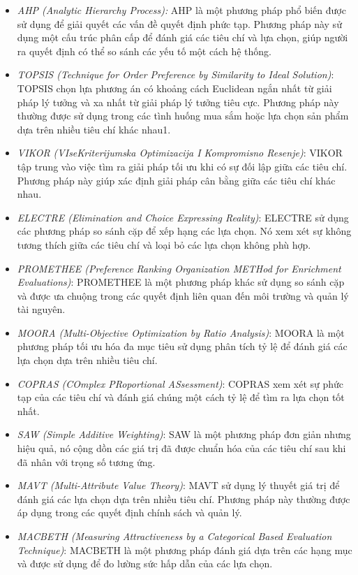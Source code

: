 \begin{itemize}
    \item \textit{AHP (Analytic Hierarchy Process):} AHP là một phương pháp phổ biến được sử dụng để giải quyết các vấn đề quyết định phức tạp. Phương pháp này sử dụng một cấu trúc phân cấp để đánh giá các tiêu chí và lựa chọn, giúp người ra quyết định có thể so sánh các yếu tố một cách hệ thống.
    \item \textit{TOPSIS (Technique for Order Preference by Similarity to Ideal Solution)}: TOPSIS chọn lựa phương án có khoảng cách Euclidean ngắn nhất từ giải pháp lý tưởng và xa nhất từ giải pháp lý tưởng tiêu cực. Phương pháp này thường được sử dụng trong các tình huống mua sắm hoặc lựa chọn sản phẩm dựa trên nhiều tiêu chí khác nhau1.
    \item \textit{VIKOR (VIseKriterijumska Optimizacija I Kompromisno Resenje)}: VIKOR tập trung vào việc tìm ra giải pháp tối ưu khi có sự đối lập giữa các tiêu chí. Phương pháp này giúp xác định giải pháp cân bằng giữa các tiêu chí khác nhau.
    \item \textit{ELECTRE (Elimination and Choice Expressing Reality)}: ELECTRE sử dụng các phương pháp so sánh cặp để xếp hạng các lựa chọn. Nó xem xét sự không tương thích giữa các tiêu chí và loại bỏ các lựa chọn không phù hợp.

    \item \textit{PROMETHEE (Preference Ranking Organization METHod for Enrichment Evaluations)}: PROMETHEE là một phương pháp khác sử dụng so sánh cặp và được ưa chuộng trong các quyết định liên quan đến môi trường và quản lý tài nguyên.

    \item \textit{MOORA (Multi-Objective Optimization by Ratio Analysis)}: MOORA là một phương pháp tối ưu hóa đa mục tiêu sử dụng phân tích tỷ lệ để đánh giá các lựa chọn dựa trên nhiều tiêu chí.

\item \textit{COPRAS (COmplex PRoportional ASsessment)}: COPRAS xem xét sự phức tạp của các tiêu chí và đánh giá chúng một cách tỷ lệ để tìm ra lựa chọn tốt nhất.

\item \textit{SAW (Simple Additive Weighting)}: SAW là một phương pháp đơn giản nhưng hiệu quả, nó cộng dồn các giá trị đã được chuẩn hóa của các tiêu chí sau khi đã nhân với trọng số tương ứng.

\item \textit{MAVT (Multi-Attribute Value Theory)}: MAVT sử dụng lý thuyết giá trị để đánh giá các lựa chọn dựa trên nhiều tiêu chí. Phương pháp này thường được áp dụng trong các quyết định chính sách và quản lý.

\item \textit{MACBETH (Measuring Attractiveness by a Categorical Based Evaluation Technique)}: MACBETH là một phương pháp đánh giá dựa trên các hạng mục và được sử dụng để đo lường sức hấp dẫn của các lựa chọn.

\end{itemize}

